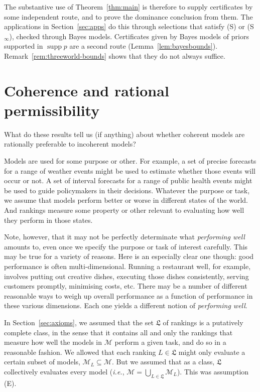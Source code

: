 \documentclass[11pt]{article}
\theoremstyle{definition}
\theoremstyle{remark}
\newcommand{\M}{\mathcal M}
\newcommand{\supp}{\operatorname{supp}}
\begin{document}
The substantive use of Theorem~\ref{thm:main} is therefore to supply certificates by some independent route, and to prove the dominance conclusion from them. The applications in Section~\ref{sec:apps} do this through selections that satisfy (S) or (S$_\infty$), checked through Bayes models. Certificates given by Bayes models of priors supported in $\supp p$ are a second route (Lemma~\ref{lem:bayesbounds}). Remark~\ref{rem:threeworld-bounds} shows that they do not always suffice.

\section{Coherence and rational permissibility}\label{sec:argument}

What do these results tell us (if anything) about whether coherent models are rationally preferable to incoherent models?

Models are used for some purpose or other. For example, a set of precise forecasts for a range of weather events might be used to estimate whether those events will occur or not. A set of interval forecasts for a range of public health events might be used to guide policymakers in their decisions. Whatever the purpose or task, we assume that models perform better or worse in different states of the world. And rankings measure some property or other relevant to evaluating how well they perform in those states.

Note, however, that it may not be perfectly determinate what \textit{performing well} amounts to, even once we specify the purpose or task of interest carefully. This may be true for a variety of reasons. Here is an especially clear one though: good performance is often multi-dimensional. Running a restaurant well, for example, involves putting out creative dishes, executing those dishes consistently, serving customers promptly, minimising costs, etc. There may be a number of different reasonable ways to weigh up overall performance as a function of performance in these various dimensions. Each one yields a different notion of \textit{performing well}.

In Section~\ref{sec:axioms}, we assumed that the set $\mathfrak L$ of rankings is a putatively complete class, in the sense that it contains all and only the rankings that measure how well the models in $\M$ perform a given task, and do so in a reasonable fashion. We allowed that each ranking $L\in\mathfrak L$ might only evaluate a certain subset of models, $\M_L\subseteq\M$. But we assumed that as a class, $\mathfrak L$ collectively evaluates every model (\textit{i.e.}, $\M=\bigcup_{L\in\mathfrak L}\M_L$). This was assumption (E).
\end{document}
